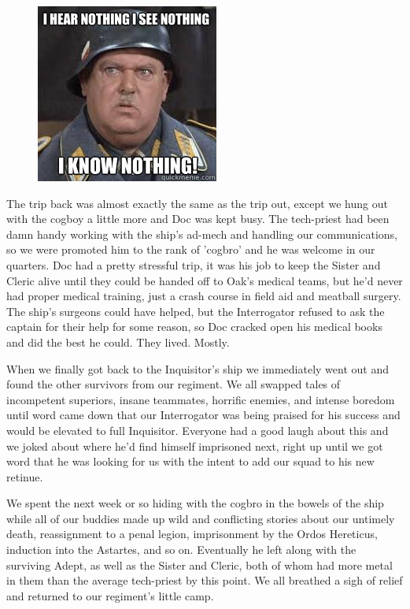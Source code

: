 \begin{figure}
	\begin{center}
		\includegraphics[width=\figwidth]{pics/2/18.jpg}
	\end{center}
\end{figure}
The trip back was almost exactly the same as the trip out, except we hung out with the cogboy a little more and Doc was kept busy.
The tech-priest had been damn handy working with the ship's ad-mech and handling our communications, so we were promoted him to the rank of 'cogbro' and he was welcome in our quarters. 
Doc had a pretty stressful trip, it was his job to keep the Sister and Cleric alive until they could be handed off to Oak's medical teams, but he'd never had proper medical training, just a crash course in field aid and meatball surgery. 
The ship's surgeons could have helped, but the Interrogator refused to ask the captain for their help for some reason, so Doc cracked open his medical books and did the best he could. 
They lived. 
Mostly.

When we finally got back to the Inquisitor's ship we immediately went out and found the other survivors from our regiment. 
We all swapped tales of incompetent superiors, insane teammates, horrific enemies, and intense boredom until word came down that our Interrogator was being praised for his success and would be elevated to full Inquisitor. 
Everyone had a good laugh about this and we joked about where he'd find himself imprisoned next, right up until we got word that he was looking for us with the intent to add our squad to his new retinue.

We spent the next week or so hiding with the cogbro in the bowels of the ship while all of our buddies made up wild and conflicting stories about our untimely death, reassignment to a penal legion, imprisonment by the Ordos Hereticus, induction into the Astartes, and so on. 
Eventually he left along with the surviving Adept, as well as the Sister and Cleric, both of whom had more metal in them than the average tech-priest by this point. 
We all breathed a sigh of relief and returned to our regiment's little camp.

